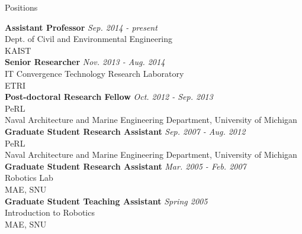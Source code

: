 \begin{rSection}{Positions}

{\bf Assistant Professor} \hfill {\em Sep. 2014 - present} \\
Dept. of Civil and Environmental Engineering \\
\acf{KAIST}\\

{\bf Senior Researcher} \hfill {\em Nov. 2013 - Aug. 2014} \\
IT Convergence Technology Research Laboratory\\
\acf{ETRI}\\

{\bf Post-doctoral Research Fellow} \hfill {\em Oct. 2012 - Sep. 2013} \\
\acf{PeRL}\\
Naval Architecture and Marine Engineering Department, University of Michigan\\

{\bf Graduate Student Research Assistant} \hfill {\em Sep. 2007 - Aug. 2012} \\
\acf{PeRL}\\
Naval Architecture and Marine Engineering Department, University of Michigan\\

{\bf Graduate Student Research Assistant} \hfill {\em Mar. 2005 - Feb. 2007} \\
Robotics Lab\\
\acf{MAE}, \acf{SNU}\\

{\bf Graduate Student Teaching Assistant} \hfill {\em Spring 2005} \\
Introduction to Robotics\\
\acf{MAE}, \acf{SNU}\\

\end{rSection}

